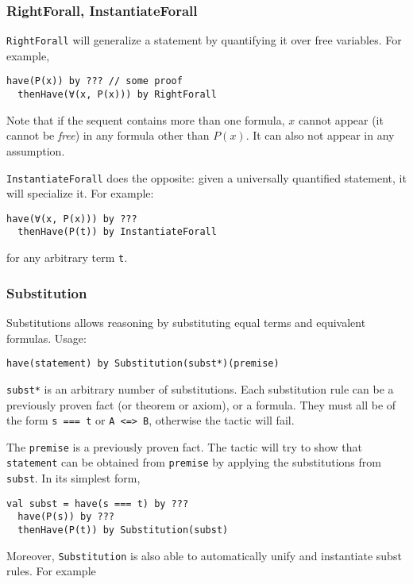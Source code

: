 \subsubsection*{RightForall, InstantiateForall}

\lstinline|RightForall| will generalize a statement by quantifying it over free
variables. For example,
\begin{lstlisting}[language=lisa]
  have(P(x)) by ??? // some proof
  thenHave(∀(x, P(x))) by RightForall
\end{lstlisting}

Note that if the sequent contains more than one formula, $x$ cannot appear (it
cannot be \emph{free}) in any formula other than $P(x)$. It can also not appear
in any assumption.

\lstinline|InstantiateForall| does the opposite: given a universally quantified statement, it will specialize it. For example:
\begin{lstlisting}[language=lisa]
  have(∀(x, P(x))) by ???
  thenHave(P(t)) by InstantiateForall
\end{lstlisting}
for any arbitrary term \lstinline|t|.

\subsubsection*{Substitution}

Substitutions allows reasoning by substituting equal terms and equivalent
formulas. Usage:
\begin{lstlisting}[language=lisa]
  have(statement) by Substitution(subst*)(premise)
\end{lstlisting}

\lstinline|subst*| is an arbitrary number of substitutions. Each substitution
rule can be a previously proven fact (or theorem or axiom), or a formula. They
must all be of the form \lstinline|s === t| or \lstinline|A <=> B|, otherwise
the tactic will fail. 

The \lstinline|premise| is a previously proven fact. The tactic will try to show
that \lstinline|statement| can be obtained from \lstinline|premise| by applying
the substitutions from \lstinline|subst|. In its simplest form,
%
\begin{lstlisting}[language=lisa]
  val subst = have(s === t) by ???
  have(P(s)) by ???
  thenHave(P(t)) by Substitution(subst)
\end{lstlisting}

Moreover, \lstinline|Substitution| is also able to  automatically unify and
instantiate subst rules. For example

